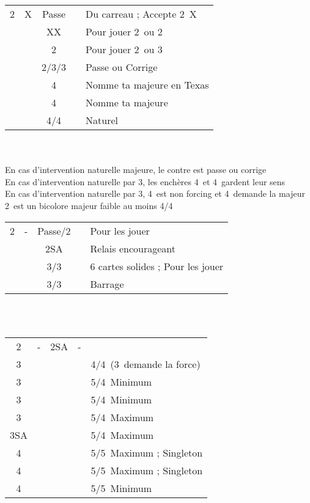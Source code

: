 \documentclass[a4paper, oneside, 11pt]{report}
\begin{document}
	\begin{tabular}{cccc|l}
	2\carreau & X & Passe && Du carreau ; Accepte 2\carreau\ X\\
	&& XX && Pour jouer 2\coeur\ ou 2\pique\\
	&& 2\coeur && Pour jouer 2\coeur\ ou 3\pique\\
	&& 2\pique/3\coeur/3\pique && Passe ou Corrige\\
	&& 4\trefle && Nomme ta majeure en Texas\\
	&& 4\carreau && Nomme ta majeure\\
	&& 4\coeur/4\pique && Naturel\\
	\end{tabular}\\\\
	En cas d'intervention naturelle majeure, le contre est passe ou corrige\\	
	En cas d'intervention naturelle par 3\trefle, les enchères 4\trefle\ et 4\carreau\ gardent leur sens\\	
	En cas d'intervention naturelle par 3\carreau, 4\trefle\ est non forcing et 4\carreau\ demande la majeur\\

\newpage
	2\coeur\ est un bicolore majeur faible au moins 4/4\\

	\begin{tabular}{cccc|l}
	2\coeur & - & Passe/2\pique && Pour les jouer\\
	&& 2SA && Relais encourageant\\
	&& 3\trefle/3\carreau && 6 cartes solides ; Pour les jouer\\
	&& 3\coeur/3\pique && Barrage\\
	\end{tabular}\\\\

	\begin{tabular}{cccc|l}
	2\coeur & - & 2SA & - &\\
	3\trefle &&&& 4\coeur/4\pique\ (3\carreau\ demande la force)\\
	3\carreau &&&& 5\coeur/4\pique\ Minimum\\
	3\coeur &&&& 5\pique/4\coeur\ Minimum\\
	3\pique &&&& 5\coeur/4\pique\ Maximum\\
	3SA &&&& 5\pique/4\coeur\ Maximum\\
	4\trefle &&&& 5\coeur/5\pique\ Maximum ; Singleton \trefle\\
	4\carreau &&&& 5\coeur/5\pique\ Maximum ; Singleton \carreau\\
	4\coeur &&&& 5\coeur/5\pique\ Minimum\\
	\end{tabular}\\\\
\end{document}
